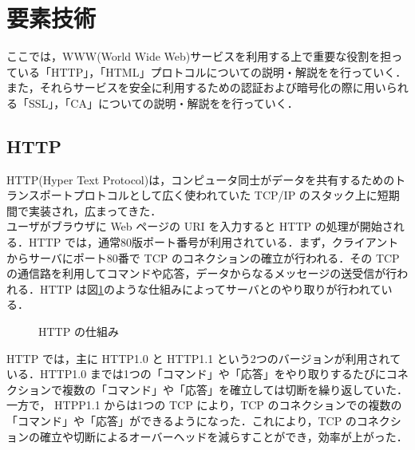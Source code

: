 \documentclass[a4j,titlepage]{jarticle}
\begin{document}
\section{要素技術}
ここでは，WWW(World Wide Web)サービスを利用する上で重要な役割を担っている「HTTP」，「HTML」プロトコルについての説明・解説をを行っていく．また，それらサービスを安全に利用するための認証および暗号化の際に用いられる「SSL」，「CA」についての説明・解説をを行っていく．

\subsection{HTTP}
HTTP(Hyper Text Protocol)は，コンピュータ同士がデータを共有するためのトランスポートプロトコルとして広く使われていた TCP/IP のスタック上に短期間で実装され，広まってきた\cite{bib:webtext}．\\
ユーザがブラウザに Web ページの URI を入力すると HTTP の処理が開始される．HTTP では，通常80版ポート番号が利用されている．まず，クライアントからサーバにポート80番で TCP のコネクションの確立が行われる．その TCP の通信路を利用してコマンドや応答，データからなるメッセージの送受信が行われる．HTTP は図\ref{fig:http}のような仕組みによってサーバとのやり取りが行われている．\\

  \begin{figure}[htbp]
    \begin{center}
      \caption{HTTP の仕組み}
     \label{fig:http}
   \end{center}
  \end{figure}

HTTP では，主に HTTP1.0 と HTTP1.1 という2つのバージョンが利用されている．HTTP1.0 までは1つの「コマンド」や「応答」をやり取りするたびにコネクションで複数の「コマンド」や「応答」を確立しては切断を繰り返していた．一方で， HTPP1.1 からは1つの TCP により，TCP のコネクションでの複数の「コマンド」や「応答」ができるようになった．これにより，TCP のコネクションの確立や切断によるオーバーヘッドを減らすことができ，効率が上がった\cite{bib:iptext}．
\end{document}
